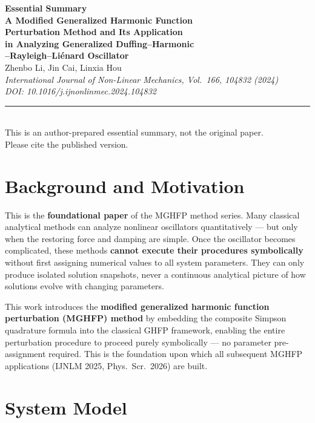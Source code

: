 \documentclass[11pt,a4paper]{article}
\begin{document}
\begin{center}
{\LARGE\bfseries\color{primary}Essential Summary}\\[12pt]
{\large\bfseries A Modified Generalized Harmonic Function\\Perturbation Method and Its Application\\in Analyzing Generalized Duffing--Harmonic\\--Rayleigh--Li\'enard Oscillator}\\[8pt]
{\normalsize Zhenbo Li, Jin Cai, Linxia Hou}\\[4pt]
{\small\itshape International Journal of Non-Linear Mechanics, Vol.\ 166, 104832 (2024)\\DOI: 10.1016/j.ijnonlinmec.2024.104832}\\[6pt]
{\small\rule{0.7\textwidth}{0.5pt}}\\[4pt]
{\small\color{accent}This is an author-prepared essential summary, not the original paper.\\Please cite the published version.}
\end{center}

\vspace{0.5em}

\section{Background and Motivation}

This is the \textbf{foundational paper} of the MGHFP method series. Many classical analytical methods can analyze nonlinear oscillators quantitatively --- but only when the restoring force and damping are simple. Once the oscillator becomes complicated, these methods \textbf{cannot execute their procedures symbolically} without first assigning numerical values to all system parameters. They can only produce isolated solution snapshots, never a continuous analytical picture of how solutions evolve with changing parameters.

This work introduces the \textbf{modified generalized harmonic function perturbation (MGHFP) method} by embedding the composite Simpson quadrature formula into the classical GHFP framework, enabling the entire perturbation procedure to proceed purely symbolically --- no parameter pre-assignment required. This is the foundation upon which all subsequent MGHFP applications (IJNLM 2025, Phys.\ Scr.\ 2026) are built.

\section{System Model}
\end{document}
